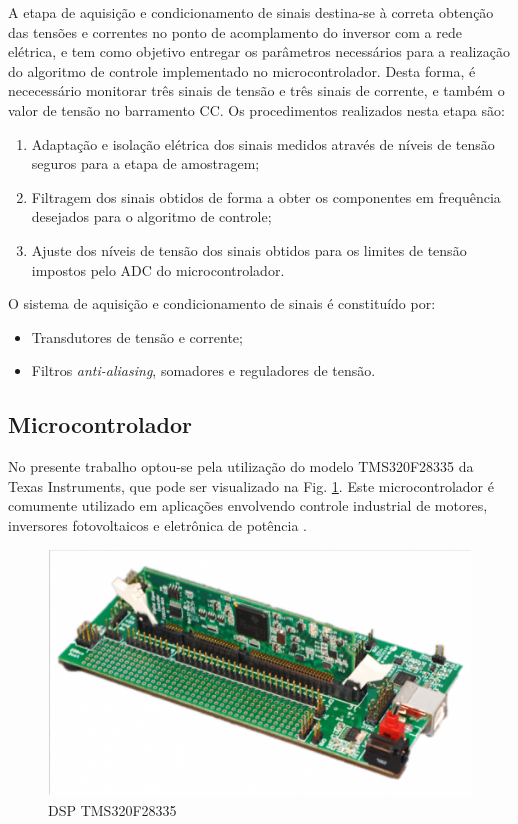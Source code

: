 A etapa de aquisição e condicionamento de sinais destina-se à correta obtenção das tensões e correntes no ponto de acomplamento do inversor com a rede elétrica, e tem como objetivo entregar os parâmetros necessários para a realização do algoritmo de controle implementado no microcontrolador.
Desta forma, é nececessário monitorar três sinais de tensão e três sinais de corrente, e também o valor de tensão no barramento CC.
Os procedimentos realizados nesta etapa são:
\begin{enumerate}
	\item Adaptação e isolação elétrica dos sinais medidos através de níveis de tensão seguros para a etapa de amostragem;
	\item Filtragem dos sinais obtidos de forma a obter os componentes em frequência desejados para o algoritmo de controle;
	\item Ajuste dos níveis de tensão dos sinais obtidos para os limites de tensão impostos pelo ADC do microcontrolador.
\end{enumerate}

O sistema de aquisição e condicionamento de sinais é constituído por:

\begin{itemize}
	\item Transdutores de tensão e corrente;
	\item Filtros \textit{anti-aliasing}, somadores e reguladores de tensão.
\end{itemize}

\subsection{Microcontrolador}

No presente trabalho optou-se pela utilização do modelo TMS320F28335 da Texas Instruments, que pode ser visualizado na Fig. \ref{fig:dsp}.
Este microcontrolador é comumente utilizado em aplicações envolvendo controle industrial de motores, inversores fotovoltaicos e eletrônica de potência \cite{texasinstruments:tms320f28335}.

\begin{figure}[!hbt]
    \begin{center}
    \includegraphics[scale=0.3]{figuras/tms320f28335.png}
    \caption{DSP TMS320F28335}
    \label{fig:dsp}
    \end{center}
\end{figure}

